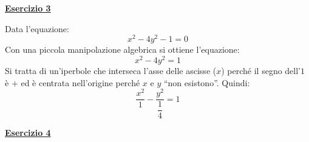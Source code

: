 \documentclass[a4paper]{article}
\newcommand{\dquotes}[1]{``#1''}
\newcommand{\example}[1]{\textcolor{Green4}{\textbf{#1}}}
\begin{document}
	\begin{flushleft}
		\example{\underline{Esercizio 3}}
	\end{flushleft}
	
	\noindent
	Data l'equazione:
	\begin{equation*}
		x^{2} - 4y^{2} - 1 = 0
	\end{equation*}
	Con una piccola manipolazione algebrica si ottiene l'equazione:
	\begin{equation*}
		x^{2} - 4y^{2} = 1
	\end{equation*}
	Si tratta di un'iperbole che interseca l'asse delle ascisse ($x$) perché il segno dell'$1$ è $+$ ed è centrata nell'origine perché $x$ e $y$ \dquotes{non esistono}. Quindi:
	\begin{equation*}
		\dfrac{x^{2}}{1} - \dfrac{y^{2}}{\dfrac{1}{4}} = 1
	\end{equation*}
	
	\begin{flushleft}
		\example{\underline{Esercizio 4}}
	\end{flushleft}
\end{document}
